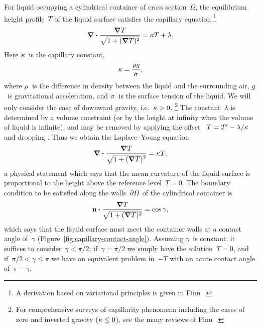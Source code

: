 For liquid occupying a cylindrical container of cross section~$\Omega$,
the equilibrium height profile~$T$ of the liquid surface
satisfies the capillary equation%
\footnote{
  A derivation based on variational principles is given
  in Finn~\cite[Chapter~1]{finn-1986-equilibrium-capillary-surfaces}.
}
\begin{equation}
  \mathop{}\!\boldsymbol{\mathbf{\nabla}} \boldsymbol{\cdot} \frac{\mathop{}\!\boldsymbol{\mathbf{\nabla}} T}{\sqrt{1 + (\mathop{}\!\boldsymbol{\mathbf{\nabla}} T)^2}} = \kappa T + \lambda.
  \label{eq:capillary}
\end{equation}
Here $\kappa$~is the capillary constant,
\begin{equation}
  \kappa = \frac{\rho g}{\sigma},
  \label{eq:capillary-constant}
\end{equation}
where $\rho$~is the difference in density
between the liquid and the surrounding air,
$g$~is gravitational acceleration,
and $\sigma$~is the surface tension of the liquid.
We will only consider the case of downward gravity,
i.e.~$\kappa > 0$.%
\footnote{
  For comprehensive surveys of capillarity phenomena including the cases of
  zero and inverted gravity ($\kappa \le 0$),
  see the many reviews of Finn~\cite{
    finn-1974-capillarity-phenomena,
    finn-1999-capillary-surface-interfaces,
    finn-2002-eight-properties-capillary-surfaces,
    finn-2002-some-properties-capillary-surfaces
  }.
}
The constant~$\lambda$ is determined by a volume constraint
(or by the height at infinity when the volume of liquid is infinite),
and may be removed by applying the offset~%
  $T = T' - \lambda / \kappa$
and dropping \offsetmarks.
Thus we obtain the Laplace--Young equation
\begin{equation}
  \mathop{}\!\boldsymbol{\mathbf{\nabla}} \boldsymbol{\cdot} \frac{\mathop{}\!\boldsymbol{\mathbf{\nabla}} T}{\sqrt{1 + (\mathop{}\!\boldsymbol{\mathbf{\nabla}} T)^2}} = \kappa T,
  \label{eq:laplace-young}
\end{equation}
a physical statement which says that
the mean curvature of the liquid surface
is proportional to the height above the reference level~$T = 0$.
The boundary condition to be satisfied along the walls~$\mathop{}\!\partial\varOmega$
of the cylindrical container is
\begin{equation}
  \mathop{}\!\boldsymbol{\mathbf{n}} \boldsymbol{\cdot} \frac{\mathop{}\!\boldsymbol{\mathbf{\nabla}} T}{\sqrt{1 + (\mathop{}\!\boldsymbol{\mathbf{\nabla}} T)^2}} = \cos\gamma,
  \label{eq:contact-boundary-condition}
\end{equation}
which says that the liquid surface must meet the container walls
at a contact angle of~$\gamma$
(Figure~\ref{fig:capillary-contact-angle}).
Assuming $\gamma$~is constant,
it suffices to consider~$\gamma < \pi/2$;
if~$\gamma = \pi/2$ we simply have the solution~$T = 0$,
and if~$\pi/2 < \gamma \le \pi$
we have an equivalent problem in~$-T$
with an acute contact angle of~$\pi - \gamma$.

